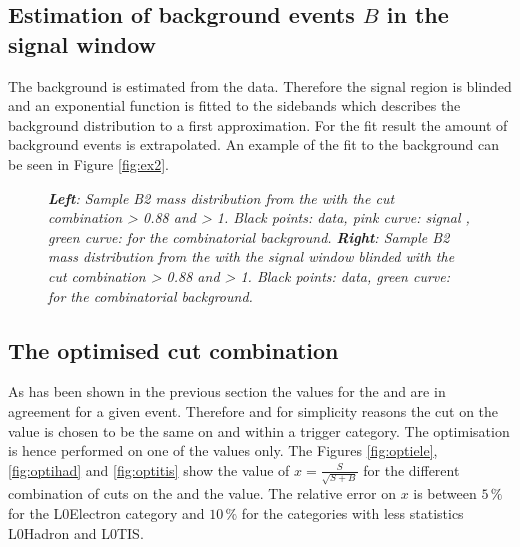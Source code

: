 \subsection{Estimation of background events $B$ in the signal window}
The background is estimated from the \BdKstee \lhcb data.
Therefore the signal region is blinded and an exponential function is fitted to the sidebands which describes the background distribution to a first approximation. For the fit result the amount of background events is extrapolated. An example of the fit to the background can be seen in Figure \ref{fig:ex2}.\\

\begin{figure}[ht]
\vspace*{-0.5cm}
\begin{center}
\end{center}
\caption{\textit{\textbf{Left}: Sample B2 \Bd mass distribution from the \BdToJPsieeKst with the cut combination \bdta > 0.88 and \dllepi > 1. Black points: \lhcb data, pink curve: signal \PDF, green curve: \PDF for the combinatorial background. \textbf{Right}: Sample B2 \Bd mass distribution from the \BdKstee with the signal window blinded with the cut combination \bdta > 0.88 and \dllepi > 1. Black points: \lhcb data, green curve: \PDF for the combinatorial background. }}
\label{fig:ex}
\end{figure}


\subsection{The optimised cut combination}
As has been shown in the previous section the values for the \bdta and \bdtb are in agreement for a given event. Therefore and for simplicity reasons the cut on the \bdtn value is chosen to be the same on \bdta and \bdtb within a trigger category. The optimisation is hence performed on one of the \bdtn values only. The Figures \ref{fig:optiele}, \ref{fig:optihad} and \ref{fig:optitis} show the value of $x = \frac{S}{\sqrt{S+B}}$ for the different combination of cuts on the \dllepi and the \bdtn value. The relative error on $x$ is between $5\, \%$ for the L0Electron category and $10\, \%$ for the categories with less statistics L0Hadron and L0TIS.\\


